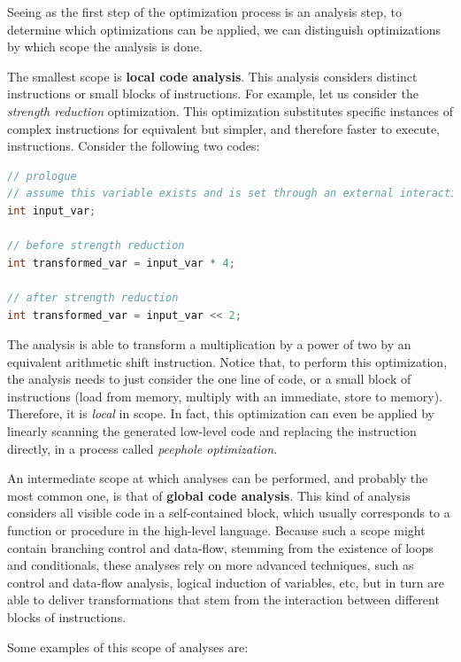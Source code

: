 Seeing as the first step of the optimization process is an analysis step, to determine which optimizations can be applied, we can distinguish optimizations by which scope the analysis is done.

The smallest scope is \textbf{local code analysis}. This analysis considers distinct instructions or small blocks of instructions. For example, let us consider the \textit{strength reduction} optimization. This optimization substitutes specific instances of complex instructions for equivalent but simpler, and therefore faster to execute, instructions. Consider the following two codes:

\begin{lstlisting}[language=C]
// prologue
// assume this variable exists and is set through an external interaction
int input_var;

// before strength reduction
int transformed_var = input_var * 4;

// after strength reduction
int transformed_var = input_var << 2;
\end{lstlisting}

The analysis is able to transform a multiplication by a power of two by an equivalent arithmetic shift instruction. Notice that, to perform this optimization, the analysis needs to just consider the one line of code, or a small block of instructions (load from memory, multiply with an immediate, store to memory). Therefore, it is \textit{local} in scope. In fact, this optimization can even be applied by linearly scanning the generated low-level code and replacing the instruction directly, in a process called \textit{peephole optimization}.

An intermediate scope at which analyses can be performed, and probably the most common one, is that of \textbf{global code analysis}\cite{Kildall1973}. This kind of analysis considers all visible code in a self-contained block, which usually corresponds to a function or procedure in the high-level language. Because such a scope might contain branching control and data-flow, stemming from the existence of loops and conditionals, these analyses rely on more advanced techniques, such as control and data-flow analysis\cite{Cytron1991}, logical induction of variables, etc, but in turn are able to deliver transformations that stem from the interaction between different blocks of instructions.

Some examples of this scope of analyses are:

